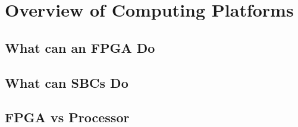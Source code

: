 \chapter{Overview of Computing Platforms}
\section{What can an FPGA Do}
\section{What can SBCs Do}
\section{FPGA vs Processor}